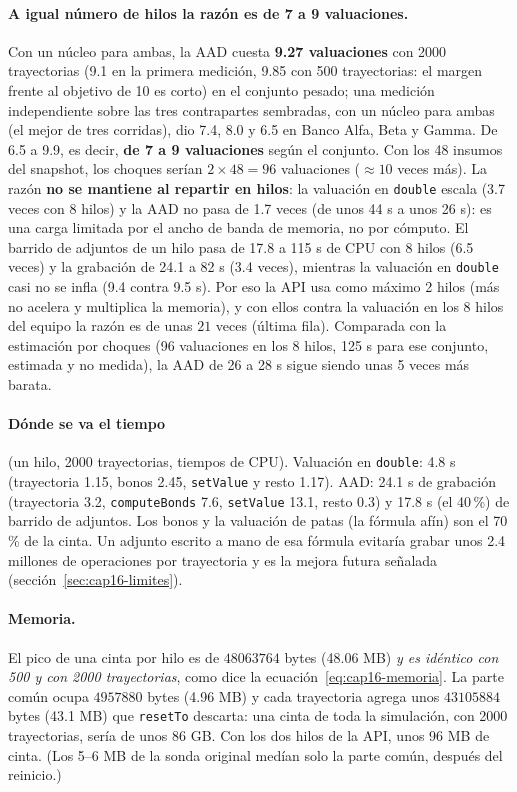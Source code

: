 \begin{sloppypar}
\paragraph{A igual número de hilos la razón es de 7 a 9 valuaciones.} Con un núcleo para ambas, la AAD cuesta
\textbf{9.27 valuaciones} con 2000 trayectorias (9.1 en la primera medición, 9.85 con 500 trayectorias: el margen
frente al objetivo de 10 es corto) en el conjunto pesado; una medición independiente sobre las tres contrapartes
sembradas, con un núcleo para ambas (el mejor de tres corridas), dio 7.4, 8.0 y 6.5 en Banco Alfa, Beta y Gamma. De 6.5 a
9.9, es decir, \textbf{de 7 a 9 valuaciones} según el conjunto. Con los 48 insumos del snapshot, los choques serían $2\times48=96$ valuaciones
($\approx10$ veces más). La razón \textbf{no se mantiene al repartir en hilos}: la valuación en \texttt{double} escala
(3.7 veces con 8 hilos) y la AAD no pasa de 1.7 veces (de unos 44 s a unos 26 s): es una carga limitada por el ancho de banda
de memoria, no por cómputo. El barrido de adjuntos de un hilo pasa de 17.8 a 115 s de CPU con 8 hilos (6.5 veces) y la
grabación de 24.1 a 82 s (3.4 veces), mientras la valuación en \texttt{double} casi no se infla (9.4 contra 9.5 s). Por
eso la API usa como máximo 2 hilos (más no acelera y multiplica la memoria), y con ellos contra la valuación en los 8
hilos del equipo la razón es de unas $21$ veces (última fila). Comparada con la estimación por choques
(96 valuaciones en los 8 hilos, 125 s para ese conjunto, estimada y no medida), la AAD de 26 a 28 s sigue siendo unas 5 veces
más barata.

\paragraph{Dónde se va el tiempo} (un hilo, 2000 trayectorias, tiempos de CPU). Valuación en \texttt{double}: 4.8 s
(trayectoria 1.15, bonos 2.45, \texttt{setValue} y resto 1.17). AAD: 24.1 s de grabación (trayectoria 3.2, \texttt{computeBonds}
7.6, \texttt{setValue} 13.1, resto 0.3) y 17.8 s (el 40\,\%) de barrido de adjuntos. Los bonos y la valuación de patas
(la fórmula afín) son el 70\,\% de la cinta. Un adjunto escrito a mano de esa fórmula evitaría grabar unos 2.4 millones de
operaciones por trayectoria y es la mejora futura señalada (sección~\ref{sec:cap16-limites}).

\paragraph{Memoria.} El pico de una cinta por hilo es de $\num{48063764}$ bytes (48.06 MB) \emph{y es idéntico con 500 y con
2000 trayectorias}, como dice la ecuación~\eqref{eq:cap16-memoria}. La parte común ocupa $\num{4957880}$ bytes (4.96 MB) y
cada trayectoria agrega unos $\num{43105884}$ bytes (43.1 MB) que \texttt{resetTo} descarta: una cinta de toda la simulación,
con 2000 trayectorias, sería de unos 86 GB. Con los dos hilos de la API, unos 96 MB de cinta. (Los 5--6 MB de la sonda
original medían solo la parte común, después del reinicio.)


\end{sloppypar}
